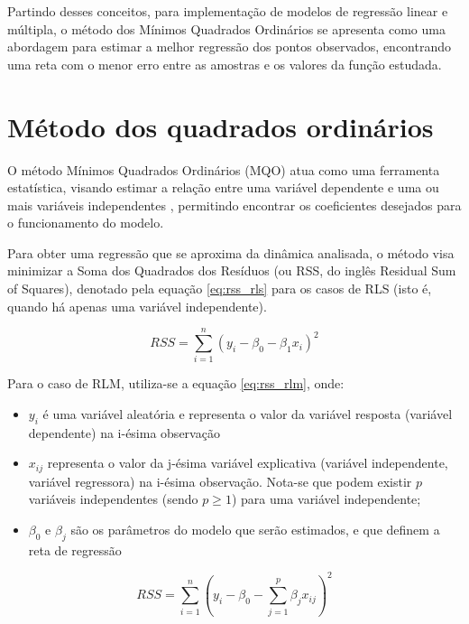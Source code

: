 Partindo desses conceitos, para implementação de modelos de regressão linear e múltipla, o método dos Mínimos Quadrados Ordinários se apresenta como uma abordagem para estimar a melhor regressão dos pontos observados, encontrando uma reta com o menor erro entre as amostras e os valores da função estudada.

\section{Método dos quadrados ordinários}

O método Mínimos Quadrados Ordinários (\gls{MQO}) atua como uma ferramenta estatística, visando estimar a relação entre uma variável dependente e uma ou mais variáveis independentes \cite{Alkama2020}, permitindo encontrar os coeficientes desejados para o funcionamento do modelo.

Para obter uma regressão que se aproxima da dinâmica analisada, o método visa minimizar a Soma dos Quadrados dos Resíduos (ou \gls{RSS}, do inglês Residual Sum of Squares), denotado pela equação \ref{eq:rss_rls} para os casos de RLS (isto é, quando há apenas uma variável independente).

\begin{equation}
	RSS = \sum_{i=1}^{n} \left(y_i - \beta_0 - \beta_1x_{i}\right)^2
	\label{eq:rss_rls}
\end{equation}

Para o caso de \gls{RLM}, utiliza-se a equação \ref{eq:rss_rlm}, onde:

\begin{itemize}
    \item $y_i$ é uma variável aleatória e representa o valor da variável resposta (variável dependente) na i-ésima observação
    \item $x_{ij}$ representa o valor da j-ésima variável explicativa (variável independente, variável regressora) na i-ésima observação. Nota-se que podem existir $p$ variáveis independentes (sendo $p \geq 1$) para uma variável independente; 
    \item $\beta_{0}$ e $\beta_{j}$ são os parâmetros do modelo que serão estimados, e que definem a reta de regressão
\end{itemize}

\begin{equation}
    RSS = \sum_{i=1}^{n} \left(y_i - \beta_0 - \sum_{j=1}^{p}\beta_jx_{ij}\right)^2
	\label{eq:rss_rlm}
\end{equation}

